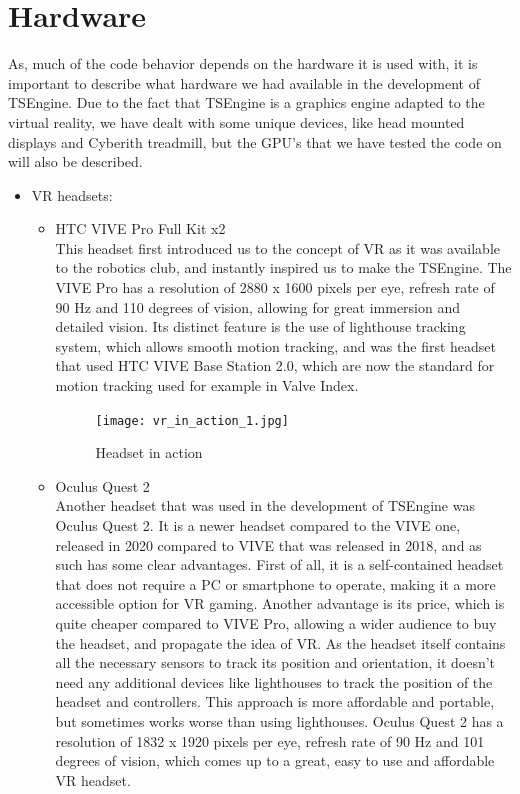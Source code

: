\newpage
\section{Hardware}
\label{sec:hardware}
\hspace{\parindent}
As, much of the code behavior depends on the hardware it is used with, it is important to describe what hardware we had available in the development of TSEngine.
Due to the fact that TSEngine is a graphics engine adapted to the virtual reality, we have dealt with some unique devices, like head mounted displays and Cyberith treadmill, but the GPU's that we have tested the code on will also be described.
\begin{itemize}
    \item VR headsets:
    \begin{itemize}
        \item HTC VIVE Pro Full Kit x2\\
        This headset first introduced us to the concept of VR as it was available to the robotics club, and instantly inspired us to make the TSEngine. The VIVE Pro has a resolution of 2880 x 1600 pixels per eye, refresh rate of 90 Hz and 110 degrees of vision, allowing for great immersion and detailed vision. Its distinct feature is the use of lighthouse tracking system, which allows smooth motion tracking, and was the first headset that used HTC VIVE Base Station 2.0, which are now the standard for motion tracking used for example in Valve Index.
        \begin{figure}[H]
        \begin{center}
         \texttt{[image: vr\_in\_action\_1.jpg]}           
        \end{center}
         \caption{Headset in action}
        \end{figure}
        \item Oculus Quest 2\\
        Another headset that was used in the development of TSEngine was Oculus Quest 2. It is a newer headset compared to the VIVE one, released in 2020 compared to VIVE that was released in 2018, and as such has some clear advantages. First of all, it is a self-contained headset that does not require a PC or smartphone to operate, making it a more accessible option for VR gaming. Another advantage is its price, which is quite cheaper compared to VIVE Pro, allowing a wider audience to buy the headset, and propagate the idea of VR. As the headset itself contains all the necessary sensors to track its position and orientation, it doesn't need any additional devices like lighthouses to track the position of the headset and controllers. This approach is more affordable and portable, but sometimes works worse than using lighthouses. Oculus Quest 2 has a resolution of 1832 x 1920 pixels per eye, refresh rate of 90 Hz and 101 degrees of vision, which comes up to a great, easy to use and affordable VR headset.

\end{itemize}
\end{itemize}
